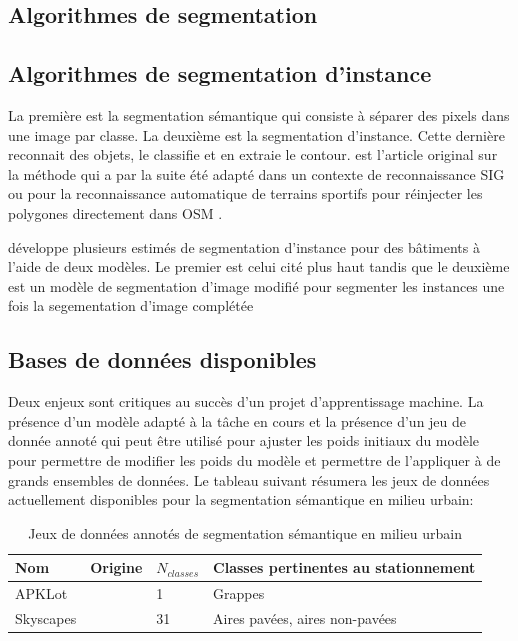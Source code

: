 \subsection{Algorithmes de segmentation}

\subsection{Algorithmes de segmentation d'instance}
La première est la segmentation sémantique qui consiste à séparer des pixels dans une image par classe. La deuxième est la segmentation d'instance. Cette dernière reconnait des objets, le classifie et en extraie le contour. \textcite{He:MaskRCNN:2018} est l'article original sur la méthode qui a par la suite été adapté dans un contexte de reconnaissance SIG \parencite{Pesek:MaskRCNN:2018} ou pour la reconnaissance automatique de terrains sportifs pour réinjecter les polygones directement dans \ac{OSM} \parencite{Remillard:JremillardImagestoosm:2024}.\par
\textcite{Fritz:InstanceSegmentation:2020} développe plusieurs estimés de segmentation d'instance pour des bâtiments à l'aide de deux modèles. Le premier est celui cité plus haut\parencite{He:MaskRCNN:2018} tandis que le deuxième est un modèle de segmentation d'image modifié pour segmenter les instances \parencite{Iglovikov:TernausNetV2Fully:2018} une fois la segementation d'image complétée

\subsection{Bases de données disponibles}
Deux enjeux sont critiques au succès d'un projet d'apprentissage machine. La présence d'un modèle adapté à la tâche en cours et la présence d'un jeu de donnée annoté qui peut être utilisé pour ajuster les poids initiaux du modèle pour permettre de modifier les poids du modèle et permettre de l'appliquer à de grands ensembles de données. Le tableau suivant résumera les jeux de données actuellement disponibles pour la segmentation sémantique en milieu urbain:
\begin{table}
 \centering
    \begin{tabular}{l l l p{}} 
    \hline
    Nom & Origine & $N_{classes}$ & Classes pertinentes au stationnement\\
    \hline
    APKLot & \cite{Hurst-Tarrab:RobustParking:2020} & 1 & Grappes\\
    Skyscapes & \cite{Azimi:SkyScapesFineGrained:2019} & 31 & Aires pavées, aires non-pavées\\
   \end{tabular}
   \caption{Jeux de données annotés de segmentation sémantique en milieu urbain}
   \label{tab:jeux_donnees_segmentation_urbain}
\end{table}